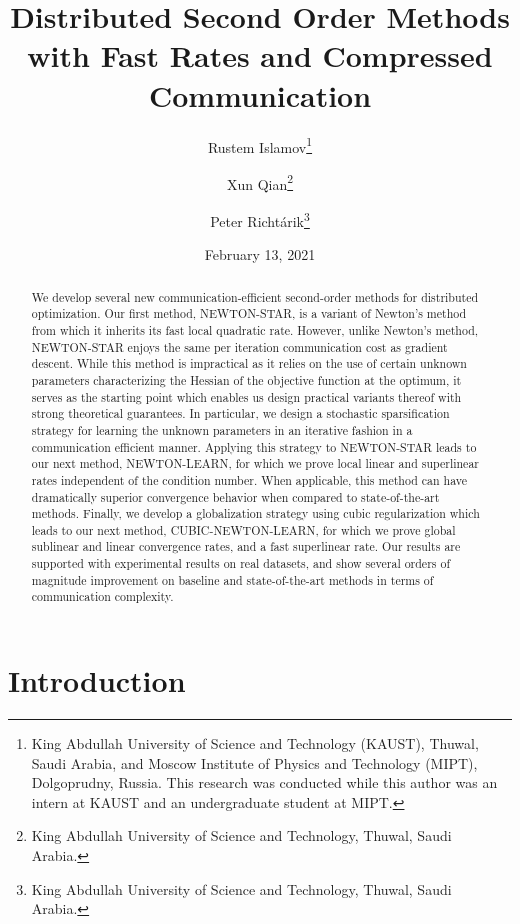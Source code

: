 \documentclass[10pt]{article}
\title{\bf Distributed Second Order Methods with Fast Rates  and Compressed Communication}
\author{Rustem Islamov\thanks{King Abdullah University of Science and Technology (KAUST), Thuwal, Saudi Arabia, and Moscow Institute of Physics and Technology (MIPT), Dolgoprudny, Russia. This research was conducted while this author was an intern at KAUST and an undergraduate student at MIPT.} \and Xun Qian\thanks{King Abdullah University of Science and Technology, Thuwal, Saudi Arabia.} \and Peter Richt\'{a}rik\thanks{King Abdullah University of Science and Technology, Thuwal, Saudi Arabia.}}
\date{February 13, 2021}
\begin{document}
\maketitle

	
\begin{abstract}
We develop several new communication-efficient second-order methods for distributed optimization. Our first method, {\sf NEWTON-STAR}, is a variant of Newton's method from which it inherits its fast local quadratic rate. However, unlike Newton's method, {\sf NEWTON-STAR} enjoys the same per iteration communication cost as gradient descent. While this method is impractical as it relies on the use of certain unknown parameters characterizing the Hessian of the objective function at the optimum,  it serves as the starting point which enables us design practical variants thereof with strong theoretical guarantees. In particular, we design a stochastic sparsification strategy for learning the unknown parameters in an iterative fashion in a communication efficient manner. Applying this strategy to {\sf NEWTON-STAR} leads to our next method, {\sf NEWTON-LEARN}, for which we prove  local linear and superlinear rates independent of the condition number. When applicable, this method can have dramatically superior convergence behavior when compared to state-of-the-art methods. Finally, we develop a globalization strategy using cubic regularization which leads to our next method, {\sf CUBIC-NEWTON-LEARN}, for which we prove global sublinear and linear convergence rates, and a fast superlinear rate. Our results are supported with experimental results on real datasets, and show several orders of magnitude improvement on baseline and state-of-the-art methods in terms of communication complexity. 
\end{abstract}

{
\tableofcontents
}

\clearpage
\section{Introduction}
\end{document}
